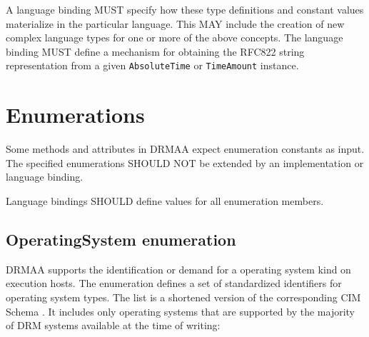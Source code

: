 \documentclass{article}
\newcommand{\h}[1]{\lstinline|#1|}
\newcommand{\langbind}[1]{\begin{shaded}#1\end{shaded}}
\newcommand{\rat}[1]{}
\begin{document}
\langbind{
A language binding MUST specify how these type definitions and constant values materialize in the particular language. This MAY include the creation of new complex language types for one or more of the above concepts. The language binding MUST define a mechanism for obtaining the RFC822 string representation from a given \h{AbsoluteTime} or \h{TimeAmount} instance.
}

\rat{
The PartialTimestamp functionality from DRMAA 1.0 was completely removed. Absolute date and time values are now expressed as RFC822 conformant data items with stringification support (conf. call Mar 31st 2009). String list for job identifiers are replaced by Job object lists (F2F meeting July 2009).

Placeholders for new job template attributes were rejected, in order to avoid circular dependencies (Conf. call Oct 20th 2010). Any extended semantic of placeholders in comparison to DRMAA1 was rejected, since the support in the DRM system didn't change. (conf call Apr. 20th 2011).
}

\section{Enumerations}

Some methods and attributes in DRMAA expect enumeration constants as input. The specified enumerations SHOULD NOT be extended by an implementation or language binding.

\langbind{
Language bindings SHOULD define values for all enumeration members.
}

\rat{Enumeration member value definitions are expected from the binding in order to foster binary portability of DRMAA-based applications.}

\subsection{OperatingSystem enumeration}
\label{sec:ostypes}

DRMAA supports the identification or demand for a operating system kind on execution hosts. The enumeration defines a set of standardized identifiers for operating system types. The list is a shortened version of the corresponding CIM Schema \cite{cim}. It includes only operating systems that are supported by the majority of DRM systems available at the time of writing:


\end{document}

